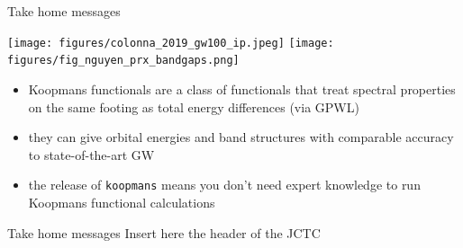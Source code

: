 \documentclass[xcolor=table,aspectratio=169]{beamer}
\numberwithin{equation}{section}
\begin{document}
\begin{frame}{Take home messages}

   \texttt{[image: figures/colonna\_2019\_gw100\_ip.jpeg]}
   \hfill
   \texttt{[image: figures/fig\_nguyen\_prx\_bandgaps.png]}
   \hfill

   \begin{itemize}
      \item Koopmans functionals are a class of functionals that treat spectral properties on the same footing as total energy differences (via GPWL)
      \item they can give orbital energies and band structures with comparable accuracy to state-of-the-art GW
      \item the release of \texttt{koopmans} means you don't need expert knowledge to run Koopmans functional calculations
   \end{itemize}

\end{frame}

\begin{frame}{Take home messages}
   Insert here the header of the JCTC
   
\end{frame}
\end{document}
